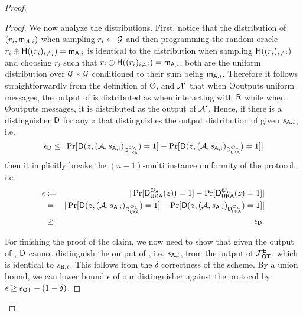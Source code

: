 \begin{proof}
\begin{proof}
We now analyze the distributions. 
First, notice that the distribution of $(r_i,\mathsf{m}_{A,i})$ when sampling $r_i\leftarrow\mathcal{G}$ and then programming the random oracle $r_i\oplus\mathsf{H}((r_i)_{i\neq j})=\mathsf{m}_{\mathsf{A},i}$ is identical to the distribution when sampling $\mathsf{H}((r_i)_{i\neq j})$ and choosing $r_i$  such that $r_i\oplus\mathsf{H}((r_i)_{i\neq j})=\mathsf{m}_{\mathsf{A},i}$, both are the uniform distribution over $\mathcal{G}\times\mathcal{G}$ conditioned to their sum being $\mathsf{m}_{\mathsf{A},i}$. Therefore it follows straightforwardly from the definition of \O, \rec and $\mathcal{A}'$ that when \O outputs uniform messages, the output of \Adv is distributed as when interacting with $\mathsf{R}$ while when \O outputs \UKA messages, it is distributed as the output of $\mathcal{A}'$. Hence, if there is a distinguisher $\mathsf D$ for any $z$ that distinguishes the output distribution of \Adv given $s_{\mathsf{A},i}$, i.e.
$$
\epsilon_{\mathsf D}\leq |\Pr[\mathsf D(z,(\mathcal{A},s_{\mathsf{A},i})_{\mathsf D_{\mathsf{UKA}}^{\mathcal{O}_\mathsf{A}}})=1]-\Pr[\mathsf D(z,(\mathcal{A},s_{\mathsf{A},i})_{\mathsf D_{\mathsf{UKA}}^{\mathcal{O}_u}})=1]|
$$
then it implicitly breaks the $(n-1)$-multi instance uniformity of the \UKA protocol, i.e. 
\begin{eqnarray*}
\epsilon&:=& |\Pr[\mathsf D_{\mathsf{UKA}}^{\mathcal{O}_{\mathsf{A}}}(z))=1] -\Pr[ \mathsf D_{\mathsf{UKA}}^{\mathcal{O}_u}(z)=1]|\\
&=&|\Pr[\mathsf D(z,(\mathcal{A},s_{\mathsf{A},i})_{\mathsf D_{\mathsf{UKA}}^{\mathcal{O}_{\mathsf{A}}}})=1] -\Pr[ \mathsf D(z,(\mathcal{A},s_{\mathsf{A},i})_{\mathsf D_{\mathsf{UKA}}^{\mathcal{O}_{u}}})=1]|\\
&\geq & \epsilon_{\mathsf D}.
\end{eqnarray*}

For finishing the proof of the claim, we now need to show that given the output of \Adv, $\mathsf D$ cannot distinguish the output of \rec, i.e. $s_{\mathsf{A},i}$,  from the output of $\mathcal{F}_{\mathsf{OT}}^\mathsf{E}$, which is identical to $s_{\mathsf{B},i}$. This follows from the $\delta$ correctness of the \UKA scheme. By a union bound, 
% 
% 
% 
 we can lower bound $\epsilon$ of our distinguisher against the \UKA protocol by $\epsilon\geq\epsilon_{\mathsf{OT}}-(1-\delta)$.
\pe
\end{proof}


\end{proof}
